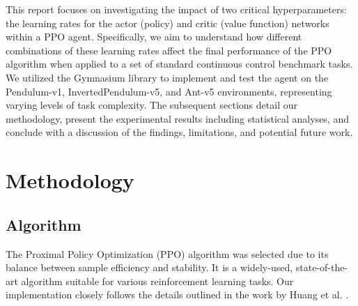 \documentclass{article}
\begin{document}
This report focuses on investigating the impact of two critical hyperparameters: the learning rates for the actor (policy) and critic (value function) networks within a PPO agent. Specifically, we aim to understand how different combinations of these learning rates affect the final performance of the PPO algorithm when applied to a set of standard continuous control benchmark tasks. We utilized the Gymnasium library \cite{towers2024gymnasium} to implement and test the agent on the Pendulum-v1, InvertedPendulum-v5, and Ant-v5 environments, representing varying levels of task complexity. The subsequent sections detail our methodology, present the experimental results including statistical analyses, and conclude with a discussion of the findings, limitations, and potential future work.

\section{Methodology}

\subsection{Algorithm}
The Proximal Policy Optimization (PPO) algorithm was selected due to its balance between sample efficiency and stability. It is a widely-used, state-of-the-art algorithm suitable for various reinforcement learning tasks. Our implementation closely follows the details outlined in the work by Huang et al. \cite{shengyi2022the37implementation}.
\end{document}
